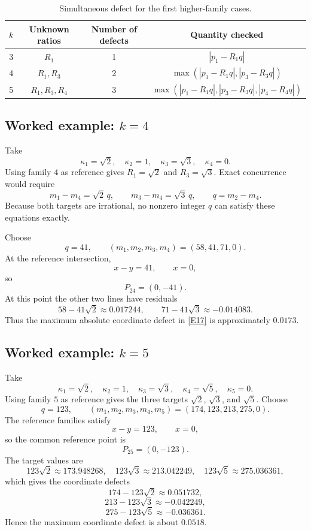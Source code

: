 \documentclass[12pt]{article}
\begin{document}
\begin{table}[H]
\centering
\caption{Simultaneous defect for the first higher-family cases.}
\begin{tabular}{@{}cccc@{}}
\toprule
$k$ & Unknown ratios & Number of defects & Quantity checked\\
\midrule
3 & $R_1$ & 1 & $|p_1-R_1q|$\\
4 & $R_1,R_3$ & 2 & $\max(|p_1-R_1q|,|p_3-R_3q|)$\\
5 & $R_1,R_3,R_4$ & 3 & $\max(|p_1-R_1q|,|p_3-R_3q|,|p_4-R_4q|)$\\
\bottomrule
\end{tabular}
\end{table}

\subsection{Worked example: $k=4$}
Take
\[
\kappa_1=\sqrt2,
\quad \kappa_2=1,
\quad \kappa_3=\sqrt3,
\quad \kappa_4=0.
\]
Using family $4$ as reference gives $R_1=\sqrt2$ and $R_3=\sqrt3$. Exact concurrence would require
\[
m_1-m_4=\sqrt2\,q,
\qquad
m_3-m_4=\sqrt3\,q,
\qquad
q=m_2-m_4.
\]
Because both targets are irrational, no nonzero integer $q$ can satisfy these equations exactly.

Choose
\[
q=41,
\qquad
(m_1,m_2,m_3,m_4)=(58,41,71,0).
\]
At the reference intersection,
\[
x- y=41,
\qquad
x=0,
\]
so
\[
P_{24}=(0,-41).
\]
At this point the other two lines have residuals
\[
58-41\sqrt2\approx0.017244,
\qquad
71-41\sqrt3\approx-0.014083.
\]
Thus the maximum absolute coordinate defect in \eqref{E17} is approximately $0.0173$.

\subsection{Worked example: $k=5$}
Take
\[
\kappa_1=\sqrt2,
\quad \kappa_2=1,
\quad \kappa_3=\sqrt3,
\quad \kappa_4=\sqrt5,
\quad \kappa_5=0.
\]
Using family $5$ as reference gives the three targets $\sqrt2$, $\sqrt3$, and $\sqrt5$. Choose
\[
q=123,
\qquad
(m_1,m_2,m_3,m_4,m_5)=(174,123,213,275,0).
\]
The reference families satisfy
\[
x-y=123,
\qquad x=0,
\]
so the common reference point is
\[
P_{25}=(0,-123).
\]
The target values are
\[
123\sqrt2\approx173.948268,
\quad
123\sqrt3\approx213.042249,
\quad
123\sqrt5\approx275.036361,
\]
which gives the coordinate defects
\[
174-123\sqrt2\approx0.051732,
\]
\[
213-123\sqrt3\approx-0.042249,
\]
\[
275-123\sqrt5\approx-0.036361.
\]
Hence the maximum coordinate defect is about $0.0518$.
\end{document}

